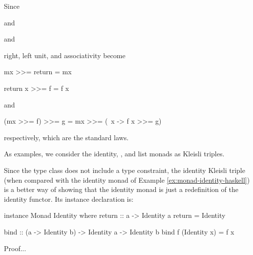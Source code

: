 Since
\begin{steps}
\end{steps}
and
\begin{steps}
\end{steps}
\begin{steps}
\end{steps}
and
\begin{steps}
    \eqbydefh{(>>=)}
\end{steps}
right, left unit, and associativity become
\begin{codehaskell}
mx >>= return = mx
\end{codehaskell}
\begin{codehaskell}
return x >>= f = f x
\end{codehaskell}
and
\begin{codehaskell}
(mx >>= f) >>= g = mx >>= (\ x -> f x >>= g)
\end{codehaskell}
respectively, which are the standard laws.


As examples, we consider the identity, , and list
monads as Kleisli triples.

\begin{example}
  \label{ex:triple-identity-haskell}

  Since the  type class does not include a
   type constraint, the identity Kleisli triple
  (when compared with the identity monad of Example
  \ref{ex:monad-identity-haskell}) is a better way of showing that the
  identity monad is just a redefinition of the identity functor. Its
  instance declaration is:
  \begin{codehaskell}
instance Monad Identity where
  return :: a -> Identity a
  return = Identity

  bind :: (a -> Identity b) -> Identity a -> Identity b
  bind f (Identity x) = f x
  \end{codehaskell}

  Proof...

\end{example}

